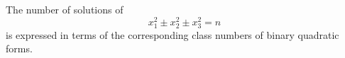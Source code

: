\begin{proposition}
    The number of solutions of
\[
    x_1^2\pm x_2^2\pm x_3^2=n
\]
    is expressed in terms of the corresponding class numbers of binary quadratic forms.
\end{proposition}
